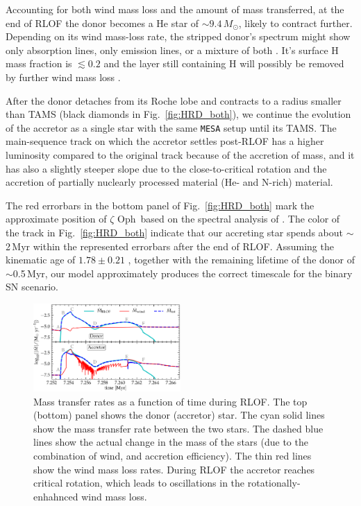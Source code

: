 \documentclass[twocolumn,twocolappendix,trackchanges]{aastex63}
\DeclareRobustCommand{\Figref}[1]{Fig.~\ref{#1}}
\newcommand{\zoph}{$\zeta$ Oph}
\begin{document}
Accounting for both wind mass loss and the amount of mass transferred,
at the end of RLOF the donor becomes a He star of
$\sim$$9.4\,M_\odot$, likely to contract further. Depending on its wind mass-loss rate, the stripped donor's spectrum might show only absorption lines, only emission lines, or a mixture of both \citep[e.g.,][]{crowther:07, neugent:17, gotberg:18}. It's surface H mass fraction is $\lesssim
0.2$ and the layer still containing H will possibly be removed by further wind mass loss \citep[e.g.,][]{gotberg:17}.

After the donor detaches from its Roche lobe and contracts to a radius smaller than TAMS (black diamonds in \Figref{fig:HRD_both}), we continue the evolution of the accretor as a single star with the same \texttt{MESA} setup until its TAMS. The main-sequence track on which the accretor settles post-RLOF has a higher luminosity compared to the original track because of the accretion of mass, and it has also a slightly steeper slope due to the close-to-critical rotation and the accretion of partially nuclearly processed material (He- and N-rich) material.

The red errorbars in the bottom panel of \Figref{fig:HRD_both} mark
the approximate position of \zoph\ based on the spectral analysis of
. The color of the track in
\Figref{fig:HRD_both} indicate that our accreting star spends about
$\sim$2\,Myr within the represented errorbars after the end of
RLOF. Assuming the kinematic age of $1.78\pm0.21$
\citep{neuhauser:20}, together with the remaining lifetime of the
donor of $\sim$0.5\,Myr, our model approximately produces the correct
timescale for the binary SN scenario.

\begin{figure}[htbp]
  \includegraphics[width=0.5\textwidth]{MT}
  \caption{Mass transfer rates as a function of time during RLOF. The top (bottom) panel
    shows the donor (accretor) star. The cyan solid lines show the
    mass transfer rate between the two stars. The dashed blue lines
    show the actual change in the mass of the stars (due to the
    combination of wind, and accretion efficiency). The thin red
    lines show the wind mass loss rates. During RLOF the accretor
    reaches critical rotation, which leads to oscillations in the
    rotationally-enhahnced wind mass loss.}
  \label{fig:MT}
\end{figure}
\end{document}
